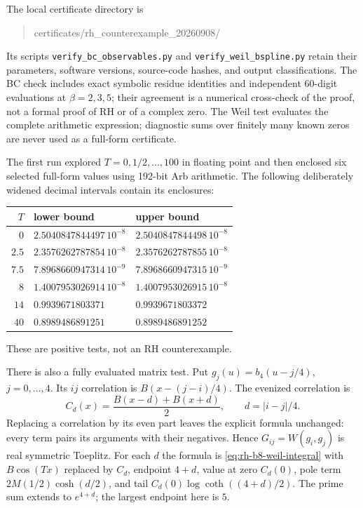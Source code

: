 The local certificate directory is
\begin{quote}\small\ttfamily
certificates/rh\_counterexample\_20260908/
\end{quote}
Its scripts \texttt{verify\_bc\_observables.py} and
\texttt{verify\_weil\_bspline.py} retain their parameters,
software versions, source-code hashes, and output classifications.
The BC check includes exact symbolic residue identities and independent
60-digit evaluations at $\beta=2,3,5$; their agreement is a numerical
cross-check of the proof, not a formal proof of RH or of a complex zero.
The Weil test evaluates the complete arithmetic expression; diagnostic sums
over finitely many known zeros are never used as a full-form certificate.

The first run explored $T=0,1/2,\ldots,100$ in floating point and then
enclosed six selected full-form values using 192-bit Arb arithmetic.
The following deliberately widened decimal intervals contain its enclosures:
\begin{center}
\begin{tabular}{rll}
\toprule
$T$ & lower bound & upper bound\\
\midrule
$0$   & $2.5040847844497\,10^{-8}$ & $2.5040847844498\,10^{-8}$\\
$2.5$ & $2.3576262787854\,10^{-8}$ & $2.3576262787855\,10^{-8}$\\
$7.5$ & $7.8968660947314\,10^{-9}$ & $7.8968660947315\,10^{-9}$\\
$8$   & $1.4007953026914\,10^{-8}$ & $1.4007953026915\,10^{-8}$\\
$14$  & $0.9939671803371$ & $0.9939671803372$\\
$40$  & $0.8989486891251$ & $0.8989486891252$\\
\bottomrule
\end{tabular}
\end{center}
These are positive tests, not an RH counterexample.

There is also a fully evaluated matrix test. Put $g_j(u)=b_4(u-j/4)$,
$j=0,\ldots,4$. Its $ij$ correlation is $B(x-(j-i)/4)$. The evenized
correlation is
\[
 C_d(x)=\frac{B(x-d)+B(x+d)}2,\qquad d=|i-j|/4.
\]
Replacing a correlation by its even part leaves the explicit formula
unchanged: every term pairs its arguments with their negatives.
Hence $G_{ij}=W(g_i,g_j)$ is real symmetric Toeplitz. For each $d$ the
formula is \eqref{eq:rh-b8-weil-integral} with $B\cos(Tx)$ replaced by
$C_d$, endpoint $4+d$, value at zero $C_d(0)$, pole term
$2M(1/2)\cosh(d/2)$, and tail
$C_d(0)\log\coth((4+d)/2)$. The prime sum extends to $e^{4+d}$;
the largest endpoint here is $5$.

